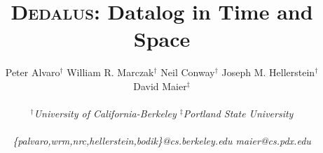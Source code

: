 \documentclass{acm_proc_article-sp-sigmod09}
\def\lang{\textsc{Dedalus}\xspace}
\begin{document}
\title{{\huge{\bf\lang}}:
Datalog in Time and Space} 
%


\author{
%
Peter Alvaro$^\dagger$ \quad William R. Marczak$^\dagger$ \quad Neil
Conway$^\dagger$ \quad Joseph M. Hellerstein$^\dagger$ \quad \\
%
David Maier$^\ddagger$\\\\
%
\fontsize{10}{10}\selectfont\itshape 
$^\dagger$University of California-Berkeley \quad $^\ddagger$Portland State
University\\\\ \fontsize{9}{9}\selectfont\ttfamily\upshape
%
\{palvaro,wrm,nrc,hellerstein,bodik\}@cs.berkeley.edu \quad maier@cs.pdx.edu
%
}

\maketitle
\end{document}

